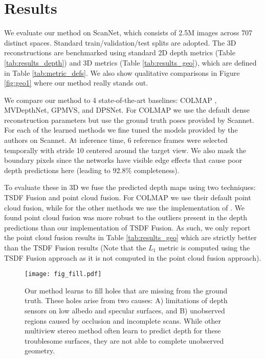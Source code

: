 \documentclass[runningheads]{llncs}
\begin{document}
\section{Results}

We evaluate our method on ScanNet\cite{dai2017scannet}, which consists of 2.5M images across 707 distinct spaces.
Standard train/validation/test splits are adopted. The 3D reconstructions are benchmarked using standard 2D depth metrics (Table \ref{tab:results_depth}) and 3D metrics (Table \ref{tab:results_geo}), which are defined in Table \ref{tab:metric_defs}. We also show qualitative comparisons in Figure \ref{fig:geo1} where our method really stands out.







We compare our method to 4 state-of-the-art baselines: COLMAP \cite{schoenberger2016mvs, schoenberger2016sfm}, MVDepthNet\cite{wang2018mvdepthnet}, GPMVS\cite{hou2019multi}, and DPSNet\cite{im2019dpsnet}.
For COLMAP we use the default dense reconstruction parameters but use the ground truth poses provided by Scannet.
For each of the learned methods we fine tuned the models provided by the authors on Scannet. At inference time, 6 reference frames were selected temporally with stride 10 centered around the target view. We also mask the boundary pixels since the networks have visible edge effects that cause poor depth predictions here (leading to 92.8\% completeness).

To evaluate these in 3D we fuse the predicted depth maps using two techniques: TSDF Fusion \cite{curless1996volumetric} and point cloud fusion.
For COLMAP we use their default point cloud fusion, while for the other methods we use the implementation of \cite{galliani2015massively}. We found point cloud fusion was more robust to the outliers present in the depth predictions than our implementation of TSDF Fusion. As such, we only report the point cloud fusion results in Table \ref{tab:results_geo} which are strictly better than the TSDF Fusion results (Note that the $L_1$ metric is computed using the TSDF Fusion approach as it is not computed in the point cloud fusion approach).

\begin{figure}
\centering
\texttt{[image: fig\_fill.pdf]}
\caption{Our method learns to fill holes that are missing from the ground truth.
These holes arise from two causes: A) limitations of depth sensors on low albedo and specular surfaces, and B) unobserved regions caused by occlusion and incomplete scans. While other multiview stereo method often learn to predict depth for these troublesome surfaces, they are not able to complete unobserved geometry.
}
\label{fig:fill}
\end{figure}
\end{document}
